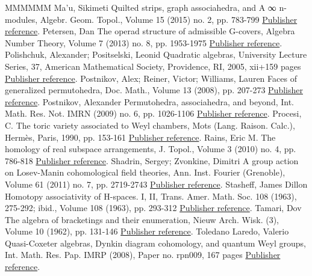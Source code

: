 \documentclass[11pt]{article}
\theoremstyle{definition}
\numberwithin{equation}{section}
\begin{document}
\begin{thebibliography}{MMMMMM}
 Ma’u, Sikimeti Quilted strips, graph associahedra, and A ∞  n-modules, Algebr. Geom. Topol., Volume 15 (2015) no. 2, pp. 783-799 \href{https://alco.centre-mersenne.org/articles/10.5802/alco.347/#MR3342676}{Publisher reference}.
 Petersen, Dan The operad structure of admissible G-covers, Algebra Number Theory, Volume 7 (2013) no. 8, pp. 1953-1975 \href{https://alco.centre-mersenne.org/articles/10.5802/alco.347/#MR3134040}{Publisher reference}.
 Polishchuk, Alexander; Positselski, Leonid Quadratic algebras, University Lecture Series, 37, American Mathematical Society, Providence, RI, 2005, xii+159 pages \href{https://alco.centre-mersenne.org/articles/10.5802/alco.347/#MR2177131}{Publisher reference}.
 Postnikov, Alex; Reiner, Victor; Williams, Lauren Faces of generalized permutohedra, Doc. Math., Volume 13 (2008), pp. 207-273 \href{https://alco.centre-mersenne.org/articles/10.5802/alco.347/#MR2520477}{Publisher reference}.
 Postnikov, Alexander Permutohedra, associahedra, and beyond, Int. Math. Res. Not. IMRN (2009) no. 6, pp. 1026-1106 \href{https://alco.centre-mersenne.org/articles/10.5802/alco.347/#MR2487491}{Publisher reference}.
 Procesi, C. The toric variety associated to Weyl chambers, Mots (Lang. Raison. Calc.), Hermès, Paris, 1990, pp. 153-161 \href{https://alco.centre-mersenne.org/articles/10.5802/alco.347/#MR1252661}{Publisher reference}.
 Rains, Eric M. The homology of real subspace arrangements, J. Topol., Volume 3 (2010) no. 4, pp. 786-818 \href{https://alco.centre-mersenne.org/articles/10.5802/alco.347/#MR2746338}{Publisher reference}.
 Shadrin, Sergey; Zvonkine, Dimitri A group action on Losev-Manin cohomological field theories, Ann. Inst. Fourier (Grenoble), Volume 61 (2011) no. 7, pp. 2719-2743 \href{https://alco.centre-mersenne.org/articles/10.5802/alco.347/#MR3112505}{Publisher reference}.
 Stasheff, James Dillon Homotopy associativity of H-spaces. I, II, Trans. Amer. Math. Soc. 108 (1963), 275-292; ibid., Volume 108 (1963), pp. 293-312 \href{https://alco.centre-mersenne.org/articles/10.5802/alco.347/#MR0158400}{Publisher reference}.
 Tamari, Dov The algebra of bracketings and their enumeration, Nieuw Arch. Wisk. (3), Volume 10 (1962), pp. 131-146 \href{https://alco.centre-mersenne.org/articles/10.5802/alco.347/#MR146227}{Publisher reference}.
 Toledano Laredo, Valerio Quasi-Coxeter algebras, Dynkin diagram cohomology, and quantum Weyl groups, Int. Math. Res. Pap. IMRP (2008), Paper no. rpn009, 167 pages \href{https://alco.centre-mersenne.org/articles/10.5802/alco.347/#MR2470574}{Publisher reference}.

\end{thebibliography}
\end{document}
